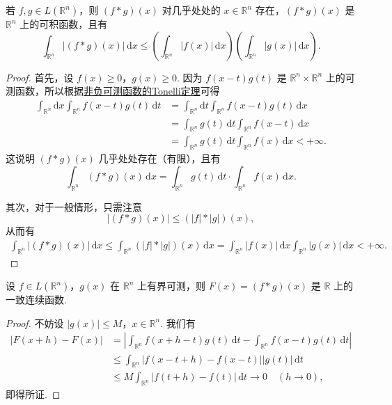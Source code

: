 \documentclass[../../main.tex]{subfiles}%
\begin{document}
\begin{theorem}
若 \( f, g \in L(\mathbb{R}^n) \)，则 \( (f * g)(x) \) 对几乎处处的 \( x \in \mathbb{R}^n \) 存在，\( (f * g)(x) \) 是 \( \mathbb{R}^n \) 上的可积函数，且有
\[
\int_{\mathbb{R}^n} |(f * g)(x)| \, \mathrm{d}x \leqslant \left( \int_{\mathbb{R}^n} |f(x)| \, \mathrm{d}x \right) \left( \int_{\mathbb{R}^n} |g(x)| \, \mathrm{d}x \right).
\]
\end{theorem}
\begin{proof}

首先，设 \( f(x) \geqslant  0 \)，\( g(x) \geqslant  0 \). 因为 \( f(x - t) g(t) \) 是 \( \mathbb{R}^n \times \mathbb{R}^n \) 上的可测函数，所以根据\hyperref[theorem:theorem:Tonelli 定理 非负可测函数的情形]{非负可测函数的Tonelli定理}可得
\begin{align*}
\int_{\mathbb{R}^n} \mathrm{d}x \int_{\mathbb{R}^n} f(x - t) g(t) \, \mathrm{d}t &= \int_{\mathbb{R}^n} \mathrm{d}t \int_{\mathbb{R}^n} f(x - t) g(t) \, \mathrm{d}x \\
&= \int_{\mathbb{R}^n} g(t) \, \mathrm{d}t \int_{\mathbb{R}^n} f(x - t) \, \mathrm{d}x \\
&= \int_{\mathbb{R}^n} g(t) \, \mathrm{d}t \int_{\mathbb{R}^n} f(x) \, \mathrm{d}x < +\infty.
\end{align*}
这说明 \( (f * g)(x) \) 几乎处处存在（有限），且有
\[
\int_{\mathbb{R}^n} (f * g)(x) \, \mathrm{d}x = \int_{\mathbb{R}^n} g(t) \, \mathrm{d}t \cdot \int_{\mathbb{R}^n} f(x) \, \mathrm{d}x.
\]

其次，对于一般情形，只需注意
\[
|(f * g)(x)| \leqslant  (|f| * |g|)(x),
\]
从而有
\begin{align*}
\int_{\mathbb{R}^n} |(f * g)(x)| \, \mathrm{d}x \leqslant  \int_{\mathbb{R}^n} (|f| * |g|)(x) \, \mathrm{d}x = \int_{\mathbb{R}^n} |f(x)| \, \mathrm{d}x \int_{\mathbb{R}^n} |g(x)| \, \mathrm{d}x < +\infty.
\end{align*}

\end{proof}

\begin{proposition}[卷积是连续函数]\label{proposition:卷积是连续函数}
设 \( f \in L(\mathbb{R}^n) \)，\( g(x) \) 在 \( \mathbb{R}^n \) 上有界可测，则 \( F(x) = (f * g)(x) \) 是 \( \mathbb{R} \) 上的一致连续函数.
\end{proposition}
\begin{proof}

不妨设 \( |g(x)| \leqslant  M \)，\( x \in \mathbb{R}^n \). 我们有
\begin{align*}
|F(x + h) - F(x)| &= \left| \int_{\mathbb{R}^n} f(x + h - t) g(t) \, \mathrm{d}t - \int_{\mathbb{R}^n} f(x - t) g(t) \, \mathrm{d}t \right| \\
&\leqslant  \int_{\mathbb{R}^n} |f(x - t + h) - f(x - t)| |g(t)| \, \mathrm{d}t \\
&\leqslant  M \int_{\mathbb{R}^n} |f(t + h) - f(t)| \, \mathrm{d}t \to 0 \quad (h \to 0),
\end{align*}
即得所证.

\end{proof}
\end{document}
